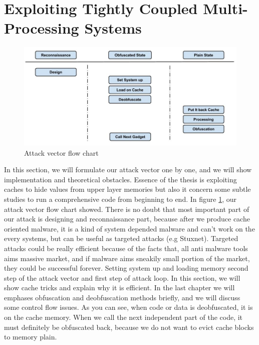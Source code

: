 	\section{Exploiting Tightly Coupled Multi-Processing Systems}
	    \begin{figure}[h!]
	        \centering
	        \includegraphics[width=1\textwidth]{img/attack_vector.jpg}
	        \caption{Attack vector flow chart}
	        \label{fig:atackvector}
	    \end{figure}
	    In this section, we will formulate our attack vector one by one, and we will show implementation and theoretical obstacles. Essence of the thesis is exploiting caches to hide values from upper layer memories but also it concern some subtle studies to run a comprehensive code from beginning to end. In figure \ref{fig:atackvector}, our attack vector flow chart showed. There is no doubt that most important part of our attack is designing and reconnaissance part, because after we produce cache oriented malware, it is a kind of system depended malware and can't work on the every systems, but can be useful as targeted attacks (e.g Stuxnet). Targeted attacks could be really efficient because of the facts that, all anti malware tools aims massive market, and if malware aims sneakily small portion of the market, they could be successful forever. Setting system up and loading memory second step of the attack vector and first step of attack loop. In this section, we will show cache tricks and explain why it is efficient. In the last chapter we will emphases obfuscation and deobfuscation methods briefly, and we will discuss some control flow issues. As you can see, when code or data is deobfuscated, it is on the cache memory. When we call the next independent part of the code, it must definitely be obfuscated back, because we do not want to evict cache blocks to memory plain. 
